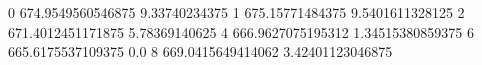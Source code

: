 0 674.9549560546875 9.33740234375
1 675.15771484375 9.5401611328125
2 671.4012451171875 5.78369140625
4 666.9627075195312 1.34515380859375
6 665.6175537109375 0.0
8 669.0415649414062 3.42401123046875
